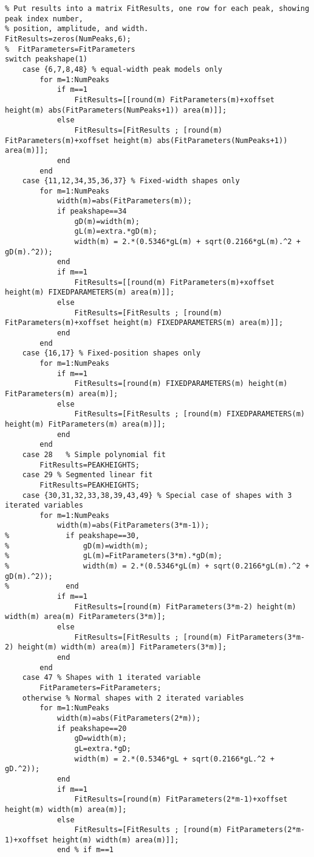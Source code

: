 \begin{lstlisting}
% Put results into a matrix FitResults, one row for each peak, showing peak index number,
% position, amplitude, and width.
FitResults=zeros(NumPeaks,6);
%  FitParameters=FitParameters
switch peakshape(1)
    case {6,7,8,48} % equal-width peak models only
        for m=1:NumPeaks
            if m==1
                FitResults=[[round(m) FitParameters(m)+xoffset height(m) abs(FitParameters(NumPeaks+1)) area(m)]];
            else
                FitResults=[FitResults ; [round(m) FitParameters(m)+xoffset height(m) abs(FitParameters(NumPeaks+1)) area(m)]];
            end
        end
    case {11,12,34,35,36,37} % Fixed-width shapes only
        for m=1:NumPeaks
            width(m)=abs(FitParameters(m));
            if peakshape==34
                gD(m)=width(m);
                gL(m)=extra.*gD(m);
                width(m) = 2.*(0.5346*gL(m) + sqrt(0.2166*gL(m).^2 + gD(m).^2));
            end
            if m==1
                FitResults=[[round(m) FitParameters(m)+xoffset height(m) FIXEDPARAMETERS(m) area(m)]];
            else
                FitResults=[FitResults ; [round(m) FitParameters(m)+xoffset height(m) FIXEDPARAMETERS(m) area(m)]];
            end
        end
    case {16,17} % Fixed-position shapes only
        for m=1:NumPeaks
            if m==1
                FitResults=[round(m) FIXEDPARAMETERS(m) height(m) FitParameters(m) area(m)];
            else
                FitResults=[FitResults ; [round(m) FIXEDPARAMETERS(m) height(m) FitParameters(m) area(m)]];
            end
        end
    case 28   % Simple polynomial fit
        FitResults=PEAKHEIGHTS;
    case 29 % Segmented linear fit
        FitResults=PEAKHEIGHTS;
    case {30,31,32,33,38,39,43,49} % Special case of shapes with 3 iterated variables
        for m=1:NumPeaks
            width(m)=abs(FitParameters(3*m-1));
%             if peakshape==30,
%                 gD(m)=width(m);
%                 gL(m)=FitParameters(3*m).*gD(m);
%                 width(m) = 2.*(0.5346*gL(m) + sqrt(0.2166*gL(m).^2 + gD(m).^2));
%             end
            if m==1
                FitResults=[round(m) FitParameters(3*m-2) height(m) width(m) area(m) FitParameters(3*m)];
            else
                FitResults=[FitResults ; [round(m) FitParameters(3*m-2) height(m) width(m) area(m)] FitParameters(3*m)];
            end
        end
    case 47 % Shapes with 1 iterated variable
        FitParameters=FitParameters;
    otherwise % Normal shapes with 2 iterated variables
        for m=1:NumPeaks
            width(m)=abs(FitParameters(2*m));
            if peakshape==20
                gD=width(m);
                gL=extra.*gD;
                width(m) = 2.*(0.5346*gL + sqrt(0.2166*gL.^2 + gD.^2));
            end
            if m==1
                FitResults=[round(m) FitParameters(2*m-1)+xoffset height(m) width(m) area(m)];
            else
                FitResults=[FitResults ; [round(m) FitParameters(2*m-1)+xoffset height(m) width(m) area(m)]];
            end % if m==1
            

\end{lstlisting}

